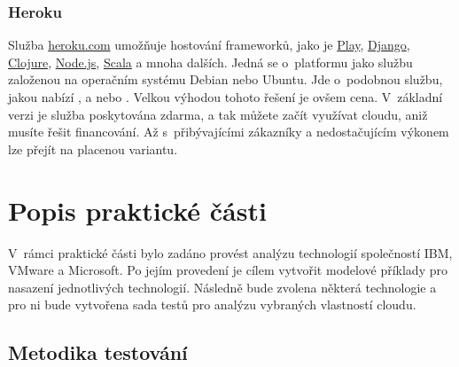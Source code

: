 \subsubsection{Heroku}
Služba \href{https://www.heroku.com}{heroku.com} umožňuje hostování frameworků, jako je \href{http://www.playframework.com/}{Play}, \href{https://www.djangoproject.com/}{Django}, \href{http://clojure.org/}{Clojure}, \href{http://nodejs.org/}{Node.js}, \href{http://www.scala-lang.org/}{Scala} a mnoha dalších. Jedná se o~platformu jako službu založenou na operačním systému Debian nebo Ubuntu. Jde o~podobnou službu, jakou nabízí ,  a nebo . Velkou výhodou tohoto řešení je ovšem cena. V~základní verzi je služba poskytována zdarma, a tak můžete začít využívat cloudu, aniž musíte řešit financování. Až s~přibývajícími zákazníky a nedostačujícím výkonem lze přejít na placenou variantu.

\newpage
\section{Popis praktické části}
\label{sec:praktickaCast}
V~rámci praktické části bylo zadáno provést analýzu technologií společností IBM, VMware a Microsoft. Po jejím provedení je cílem vytvořit modelové příklady pro nasazení jednotlivých technologií. Následně bude zvolena některá technologie a pro ni bude vytvořena sada testů pro analýzu vybraných vlastností cloudu.

\subsection{Metodika testování}
\label{p:metodikaTestovani}
